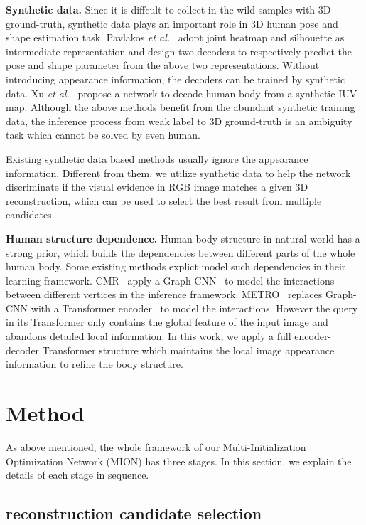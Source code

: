 \documentclass[sigconf]{acmart}
\begin{document}
\textbf{Synthetic data. }
Since it is diffcult to collect in-the-wild samples with 3D ground-truth, synthetic data plays an important role in 3D human pose and shape 
estimation task. Pavlakos \textit{et al.}~\cite{pavlakos2018learning} adopt joint heatmap and silhouette as intermediate representation and design 
two decoders to respectively predict the pose and shape parameter from the above two representations. Without introducing appearance 
information, the decoders can be trained by synthetic data. Xu \textit{et al.}~\cite{xu2019denserac} propose a network to decode human body from 
a synthetic IUV map. Although the above methods benefit from the abundant synthetic training data, the inference process from 
weak label to 3D ground-truth is an ambiguity task which cannot be solved by even human. 

Existing synthetic data based methods usually ignore the appearance information. Different from them, we utilize synthetic data to help 
the network discriminate if the visual evidence in RGB image matches a given 3D reconstruction, which can be used to select the best 
result from multiple candidates. 

\textbf{Human structure dependence. }
Human body structure in natural world has a strong prior, which builds the dependencies between different parts of the whole human body. 
Some existing methods explict model such dependencies in their learning framework. CMR~\cite{kolotouros2019convolutional} apply a 
Graph-CNN~\cite{kipf2016semi} to model the interactions between different vertices in the inference framework. 
METRO~\cite{lin2020end} replaces Graph-CNN with a Transformer encoder~\cite{vaswani2017attention} to model the interactions. 
However the query in its Transformer only contains the global feature of the input image and abandons detailed local information. 
In this work, we apply a full encoder-decoder Transformer structure which maintains the local image appearance information to refine the body 
structure. 







\section{Method}
As above mentioned, the whole framework of our Multi-Initialization Optimization Network (MION) has 
three stages. In this section, we explain the details of each stage in sequence.  

\subsection{reconstruction candidate selection}
\end{document}
